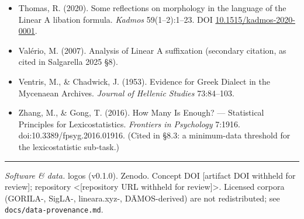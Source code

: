 \documentclass[
  10pt,
]{article}
\begin{document}
\begin{itemize}
  8:1581129. DOI
  \href{https://doi.org/10.3389/frai.2025.1581129}{10.3389/frai.2025.1581129}.
  Code: github.com/ftamburin/CSA\_OptMatcher.
\item
  Thomas, R. (2020). Some reflections on morphology in the language of
  the Linear A libation formula. \emph{Kadmos} 59(1--2):1--23. DOI
  \href{https://doi.org/10.1515/kadmos-2020-0001}{10.1515/kadmos-2020-0001}.
\item
  Valério, M. (2007). Analysis of Linear A suffixation (secondary
  citation, as cited in Salgarella 2025 §8).
\item
  Ventris, M., \& Chadwick, J. (1953). Evidence for Greek Dialect in the
  Mycenaean Archives. \emph{Journal of Hellenic Studies} 73:84--103.
\item
  Zhang, M., \& Gong, T. (2016). How Many Is Enough? --- Statistical
  Principles for Lexicostatistics. \emph{Frontiers in Psychology}
  7:1916. doi:10.3389/fpsyg.2016.01916. (Cited in §8.3: a minimum-data
  threshold for the lexicostatistic sub-task.)
\end{itemize}

\begin{center}\rule{0.5\linewidth}{0.5pt}\end{center}

\emph{Software \& data.} logos (v0.1.0). Zenodo. Concept DOI {[}artifact
DOI withheld for review{]}; repository \textless{[}repository URL
withheld for review{]}\textgreater. Licensed corpora (GORILA-, SigLA-,
lineara.xyz-, DĀMOS-derived) are not redistributed; see
\texttt{docs/data-provenance.md}.
\end{document}
